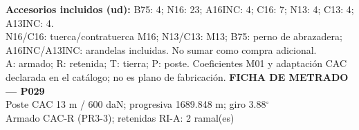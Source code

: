 \begingroup\scriptsize
\textbf{Accesorios incluidos (ud):} B75: 4; N16: 23; A16INC: 4; C16: 7; N13: 4; C13: 4; A13INC: 4.\\
N16/C16: tuerca/contratuerca M16; N13/C13: M13; B75: perno de abrazadera; A16INC/A13INC: arandelas incluidas. No sumar como compra adicional.\\
A: armado; R: retenida; T: tierra; P: poste. Coeficientes M01 y adaptación CAC declarada en el catálogo; no es plano de fabricación.
\endgroup\endgroup
\clearpage{}
\begingroup\small\setlength{\parskip}{3pt}\renewcommand{\arraystretch}{1.05}
\textbf{\large FICHA DE METRADO — P029}\\[4pt]
Poste CAC 13 m / 600 daN; progresiva 1689.848 m; giro 3.88\ensuremath{^\circ}\\
Armado CAC-R (PR3-3); retenidas RI-A: 2 ramal(es)\\
\begingroup\scriptsize
